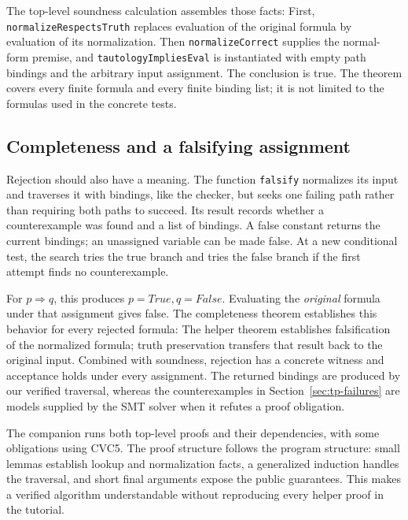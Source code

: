 \documentclass[review]{jfp-epi}
\newcommand{\code}[1]{\texttt{#1}}
\begin{document}
The top-level soundness calculation assembles those facts:
First, \code{normalizeRespectsTruth} replaces evaluation of the original formula
by evaluation of its normalization. Then \code{normalizeCorrect} supplies the
normal-form premise, and \code{tautologyImpliesEval} is instantiated with empty
path bindings and the arbitrary input assignment. The conclusion is true.
The theorem covers every finite formula and every finite binding list; it is
not limited to the formulas used in the concrete tests.

\subsection{Completeness and a falsifying assignment}

Rejection should also have a meaning. The function \code{falsify} normalizes
its input and traverses it with bindings, like the checker, but seeks one
failing path rather than requiring both paths to succeed. Its result records
whether a counterexample was found and a list of bindings. A false constant
returns the current bindings; an unassigned variable can be made false. At a
new conditional test, the search tries the true branch and tries the false
branch if the first attempt finds no counterexample.

For $p\Rightarrow q$, this produces $p=\mathit{True},q=\mathit{False}$.
Evaluating the \emph{original} formula under that assignment gives false. The
completeness theorem establishes this behavior for every rejected formula:
The helper theorem establishes falsification of the normalized formula; truth
preservation transfers that result back to the original input. Combined with
soundness, rejection has a concrete witness and acceptance holds under every
assignment. The returned bindings are produced by our verified traversal,
whereas the counterexamples in Section~\ref{sec:tp-failures} are models supplied
by the SMT solver when it refutes a proof obligation.

The companion runs both top-level proofs and their dependencies, with some
obligations using CVC5. The proof structure follows the program structure:
small lemmas establish lookup and normalization facts, a generalized induction
handles the traversal, and short final arguments expose the public guarantees.
This makes a verified algorithm understandable without reproducing every helper
proof in the tutorial.

\end{document}
